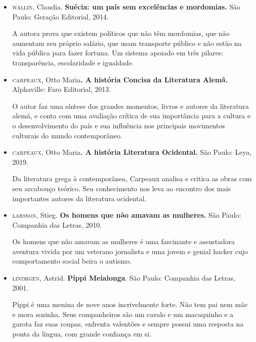 \documentclass[12pt]{extarticle}
\begin{document}
\begin{itemize}
\item\textsc{wallin}, Claudia. \textbf{Suécia: um país sem excelências e mordomias.}
São Paulo: Geração Editorial, 2014.

A autora prova que existem políticos que não têm mordomias, que não
aumentam seu próprio salário, que usam transporte público e não estão na
vida pública para fazer fortuna. Um sistema apoiado em três pilares:
transparência, escolaridade e igualdade.

\item\textsc{carpeaux}, Otto Maria\textbf{. A história Concisa da Literatura Alemã.}
Alphaville: Faro Editorial, 2013.

O autor faz uma síntese dos grandes momentos, livros e autores da
literatura alemã, e conta com uma avaliação crítica de sua importância
para a cultura e o desenvolvimento do país e sua influência nos
principais movimentos culturais do mundo contemporâneo.

\item\textsc{carpeaux}, Otto Maria\textbf{. A história Literatura Ocidental.} São
Paulo: Leya, 2019.

Da literatura grega à contemporânea, Carpeaux analisa e critica as obras
com seu arcabouço teórico. Seu conhecimento nos leva ao encontro dos
mais importantes autores da literatura ocidental.

\item\textsc{larsson}, Stieg. \textbf{Os homens que não amavam as mulheres.} São
Paulo: Companhia das Letras, 2010.

Os homens que não amavam as mulheres é uma fascinante e assustadora
aventura vivida por um veterano jornalista e uma jovem e genial hacker
cujo comportamento social beira o autismo.

\item\textsc{lindrgen}, Astrid. \textbf{Píppi Meialonga}. São Paulo: Companhia das
Letras, 2001.

Píppi é uma menina de nove anos incrivelmente forte. Não tem pai nem mãe
e mora sozinha. Seus companheiros são um cavalo e um macaquinho e a
garota faz suas roupas, enfrenta valentões e sempre possui uma resposta
na ponta da língua, com grande confiança em si.


\end{itemize}
\end{document}

